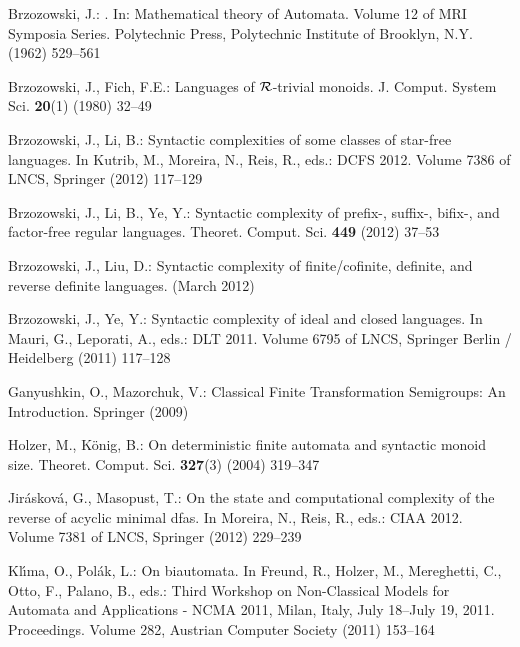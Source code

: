 \documentclass{llncs}
\begin{document}
\providecommand{\noopsort}[1]{}
\begin{thebibliography}{10}

Brzozowski, J.:
.
\newblock In: Mathematical theory of Automata. Volume 12 of MRI Symposia
  Series.
\newblock Polytechnic Press, Polytechnic Institute of Brooklyn, N.Y. (1962)
  529--561

Brzozowski, J., Fich, F.E.:
\newblock Languages of {${\mathcal R}\/$}-trivial monoids.
\newblock J. Comput. System Sci. \textbf{20}(1) (1980)  32--49

Brzozowski, J., Li, B.:
\newblock Syntactic complexities of some classes of star-free languages.
\newblock In Kutrib, M., Moreira, N., Reis, R., eds.: DCFS 2012. Volume 7386 of
  LNCS, Springer (2012)  117--129

Brzozowski, J., Li, B., Ye, Y.:
\newblock Syntactic complexity of prefix-, suffix-, bifix-, and factor-free
  regular languages.
\newblock Theoret. Comput. Sci. \textbf{449} (2012)  37--53

Brzozowski, J., Liu, D.:
\newblock Syntactic complexity of finite/cofinite, definite, and reverse
  definite languages.
 (March 2012)

Brzozowski, J., Ye, Y.:
\newblock Syntactic complexity of ideal and closed languages.
\newblock In Mauri, G., Leporati, A., eds.: DLT 2011. Volume 6795 of LNCS,
  Springer Berlin / Heidelberg (2011)  117--128

Ganyushkin, O., Mazorchuk, V.:
\newblock Classical Finite Transformation Semigroups: An Introduction.
\newblock Springer (2009)

Holzer, M., K\"{o}nig, B.:
\newblock On deterministic finite automata and syntactic monoid size.
\newblock Theoret. Comput. Sci. \textbf{327}(3) (2004)  319--347

Jir{\'a}skov{\'a}, G., Masopust, T.:
\newblock On the state and computational complexity of the reverse of acyclic
  minimal dfas.
\newblock In Moreira, N., Reis, R., eds.: CIAA 2012. Volume 7381 of LNCS,
  Springer (2012)  229--239

Kl\'{\i}ma, O., Pol{\'a}k, L.:
\newblock On biautomata.
\newblock In Freund, R., Holzer, M., Mereghetti, C., Otto, F., Palano, B.,
  eds.: Third Workshop on Non-Classical Models for Automata and Applications -
  NCMA 2011, Milan, Italy, July 18--July 19, 2011. Proceedings. Volume 282,
  Austrian Computer Society (2011)  153--164


\end{thebibliography}
\end{document}
